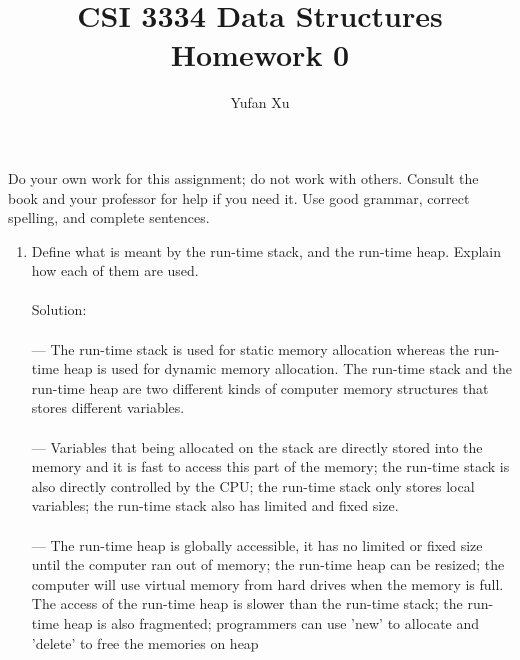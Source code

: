 \documentclass[12pt]{article}
\title{CSI 3334 Data Structures\\Homework 0}
\author{Yufan Xu}
\begin{document}
\thispagestyle{empty}

\maketitle 



Do your own work for this assignment; do not work with others. Consult the book
and your professor for help if you need it.  Use good grammar, correct spelling, and complete sentences.


\begin{enumerate}
\item Define what is meant by the run-time stack, and the run-time heap. Explain
how each of them are used.
\\\\Solution:\\
\\--- The run-time stack is used for static memory allocation whereas the run-time heap is used for dynamic memory allocation. The run-time stack and the run-time heap are two different kinds of computer memory structures that stores different variables. 
\\\\--- Variables that being allocated on the stack are directly  stored into the memory and it is fast to access this part of the memory; the run-time stack is also directly controlled by the CPU; the run-time stack only stores local variables; the run-time stack also has limited and fixed size.
\\\\--- The run-time heap is globally accessible, it has no limited or fixed size until the computer ran out of memory; the run-time heap can be resized; the computer will use virtual memory from hard drives when the memory is full. The access of the run-time heap is slower than the run-time stack; the run-time heap is also fragmented; programmers can use 'new' to allocate and 'delete'  to free the memories on heap\\\\


\end{enumerate}
\end{document}

